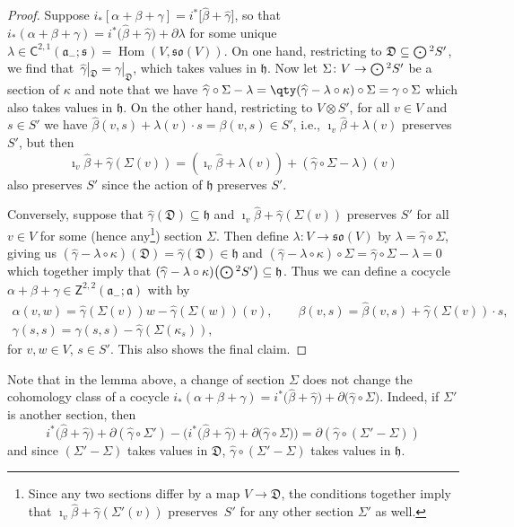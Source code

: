 \documentclass[pdftex]{sigma}
\numberwithin{equation}{section}
\newcommand{\fa}{\mathfrak{a}}
\newcommand{\fh}{\mathfrak{h}}
\newcommand{\fs}{\mathfrak{s}}
\newcommand{\fso}{\mathfrak{so}}
\newcommand{\fD}{\mathfrak{D}}
\newcommand{\ssC}{\mathsf{C}}
\newcommand{\ssZ}{\mathsf{Z}}
\newcommand{\betahat}{\widehat{\beta}}
\newcommand{\gammahat}{\widehat{\gamma}}
\newcommand{\Odot}{\mathchoice{{\textstyle\bigodot}}{\bigodot}{\bigodot}{\bigodot}}
\newcommand{\1}{\mathbbm{1}}
\DeclareMathOperator{\Hom}{Hom}
\begin{document}
\begin{proof}
	Suppose $i_*[\alpha+\beta+\gamma]=i^*\big[\betahat+\gammahat\big]$, so that $i_*(\alpha+\beta+\gamma)=i^*\bigl(\betahat+\gammahat\bigr)+\partial\lambda$ for some unique $\lambda\in\ssC^{2,1}(\fa_-;\fs)=\Hom(V,\fso(V))$. On one hand, restricting to $\fD\subseteq\Odot^2S'$, we find that~${\gammahat|_{\fD}=\gamma|_{\fD}}$, which takes values in $\fh$. Now let $\Sigma\colon V\to \Odot^2 S'$ be a section of $\kappa$ and note that we have
$\gammahat\circ\Sigma - \lambda
			= \qty(\gammahat - \lambda\circ\kappa)\circ\Sigma
			= \gamma\circ\Sigma
$
	which also takes values in $\fh$. On the other hand, restricting to $V\otimes S'$, for all $v\in V$ and $s\in S'$ we have $\betahat(v,s)+\lambda(v)\cdot s = \beta(v,s)\in S'$, i.e., $\imath_v\betahat+\lambda(v)$ preserves $S'$, but then
	\[
		\imath_v\betahat + \gammahat(\Sigma(v)) = (\imath_v\betahat + \lambda(v)) + (\gammahat\circ\Sigma-\lambda)(v)
	\]
	also preserves $S'$ since the action of $\fh$ preserves $S'$.
	
	Conversely, suppose that $\gammahat(\fD)\subseteq\fh$ and $\imath_v\betahat+\gammahat(\Sigma(v))$ preserves $S'$ for all $v\in V$ for some (hence any\footnote{Since any two sections differ by a map $V\to\fD$, the conditions together imply that $\imath_v\betahat+\gammahat(\Sigma'(v))$ preserves~$S'$ for any other section $\Sigma'$ as well.})
	section $\Sigma$. Then define $\lambda\colon V\to\fso(V)$ by $\lambda=\gammahat\circ\Sigma$, giving us $(\gammahat-\lambda\circ\kappa)(\fD)=\gammahat(\fD)\in\fh$ and $(\gammahat-\lambda\circ\kappa)\circ\Sigma=\gammahat\circ\Sigma-\lambda=0$ which together imply that $(\gammahat-\lambda\circ\kappa)\bigl(\Odot^2S'\bigr)\subseteq \fh$. Thus we can define a cocycle $\alpha+\beta+\gamma\in\ssZ^{2,2}(\fa_-;\fa)$ with \smash{$i_*[\alpha+\beta+\gamma]=i^*\big[\betahat+\gammahat\big]$} by
	\begin{gather*}%
		\alpha(v,w)	= \gammahat(\Sigma(v))w - \gammahat(\Sigma(w))(v),\qquad
		\beta(v,s)	= \betahat(v,s) + \gammahat(\Sigma(v))\cdot s,\\
		\gamma(s,s) = \gammahat(s,s) - \gammahat(\Sigma(\kappa_s)),
	\end{gather*}
	for $v,w\in V$, $s\in S'$. This also shows the final claim.
\end{proof}

Note that in the lemma above, a change of section $\Sigma$ does not change the cohomology class of a cocycle $i_*(\alpha+\beta+\gamma)=i^*\bigl(\betahat+\gammahat\bigr)+\partial\bigl(\gammahat\circ\Sigma\bigr)$. Indeed, if $\Sigma'$ is another section, then
\[
	i^*\bigl(\betahat+\gammahat\bigr)+\partial(\gammahat\circ\Sigma') - \bigl(i^*\bigl(\betahat+\gammahat\bigr)+\partial\bigl(\gammahat\circ\Sigma\bigr)\bigr)
	= \partial(\gammahat\circ(\Sigma'-\Sigma))
\]
and since $(\Sigma'-\Sigma)$ takes values in $\fD$, $\gammahat\circ(\Sigma'-\Sigma)$ takes values in $\fh$.
\end{document}
